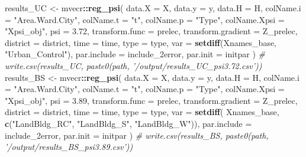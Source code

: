 \documentclass[
]{article}
\newenvironment{Shaded}{\begin{snugshade}}{\end{snugshade}}
\newcommand{\CommentTok}[1]{\textcolor[rgb]{0.56,0.35,0.01}{\textit{#1}}}
\newcommand{\DataTypeTok}[1]{\textcolor[rgb]{0.13,0.29,0.53}{#1}}
\newcommand{\FloatTok}[1]{\textcolor[rgb]{0.00,0.00,0.81}{#1}}
\newcommand{\KeywordTok}[1]{\textcolor[rgb]{0.13,0.29,0.53}{\textbf{#1}}}
\newcommand{\NormalTok}[1]{#1}
\newcommand{\OperatorTok}[1]{\textcolor[rgb]{0.81,0.36,0.00}{\textbf{#1}}}
\newcommand{\StringTok}[1]{\textcolor[rgb]{0.31,0.60,0.02}{#1}}
\begin{document}
\begin{Shaded}
\begin{Highlighting}[]
\NormalTok{results_UC <-}\StringTok{ }\NormalTok{mvecr}\OperatorTok{::}\KeywordTok{reg_psi}\NormalTok{(}
  \DataTypeTok{data.X =}\NormalTok{ X, }\DataTypeTok{data.y =}\NormalTok{ y, }\DataTypeTok{data.H =}\NormalTok{ H,}
  \DataTypeTok{colName.i =} \StringTok{"Area.Ward.City"}\NormalTok{, }\DataTypeTok{colName.t =} \StringTok{"t"}\NormalTok{,  }
  \DataTypeTok{colName.p =} \StringTok{"Type"}\NormalTok{, }\DataTypeTok{colName.Xpsi =} \StringTok{"Xpsi_obj"}\NormalTok{,}
  \DataTypeTok{psi =} \FloatTok{3.72}\NormalTok{,}
  \DataTypeTok{transform.func =}\NormalTok{ prelec, }\DataTypeTok{transform.gradient =}\NormalTok{ Z_prelec,}
  \DataTypeTok{district =}\NormalTok{ district, }\DataTypeTok{time =}\NormalTok{ time, }\DataTypeTok{type =}\NormalTok{ type,}
  \DataTypeTok{var =} \KeywordTok{setdiff}\NormalTok{(Xnames_base, }\StringTok{"Urban_Control"}\NormalTok{),}
  \DataTypeTok{par.include =}\NormalTok{ include_2error,}
  \DataTypeTok{par.init =}\NormalTok{ initpar}
\NormalTok{)}
\CommentTok{# write.csv(results_UC, paste0(path, '/output/results_UC_psi3.72.csv'))}
\NormalTok{results_BS <-}\StringTok{ }\NormalTok{mvecr}\OperatorTok{::}\KeywordTok{reg_psi}\NormalTok{(}
  \DataTypeTok{data.X =}\NormalTok{ X, }\DataTypeTok{data.y =}\NormalTok{ y, }\DataTypeTok{data.H =}\NormalTok{ H,}
  \DataTypeTok{colName.i =} \StringTok{"Area.Ward.City"}\NormalTok{, }\DataTypeTok{colName.t =} \StringTok{"t"}\NormalTok{, }
  \DataTypeTok{colName.p =} \StringTok{"Type"}\NormalTok{, }\DataTypeTok{colName.Xpsi =} \StringTok{"Xpsi_obj"}\NormalTok{,}
  \DataTypeTok{psi =} \FloatTok{3.89}\NormalTok{,}
  \DataTypeTok{transform.func =}\NormalTok{ prelec, }\DataTypeTok{transform.gradient =}\NormalTok{ Z_prelec,}
  \DataTypeTok{district =}\NormalTok{ district, }\DataTypeTok{time =}\NormalTok{ time, }\DataTypeTok{type =}\NormalTok{ type,}
  \DataTypeTok{var =} \KeywordTok{setdiff}\NormalTok{(}
\NormalTok{    Xnames_base, }\KeywordTok{c}\NormalTok{(}\StringTok{"LandBldg_RC"}\NormalTok{, }\StringTok{"LandBldg_S"}\NormalTok{, }\StringTok{"LandBldg_W"}\NormalTok{)),}
  \DataTypeTok{par.include =}\NormalTok{ include_2error,}
  \DataTypeTok{par.init =}\NormalTok{ initpar}
\NormalTok{)}
\CommentTok{# write.csv(results_BS, paste0(path, '/output/results_BS_psi3.89.csv'))}


\end{Highlighting}
\end{Shaded}
\end{document}
